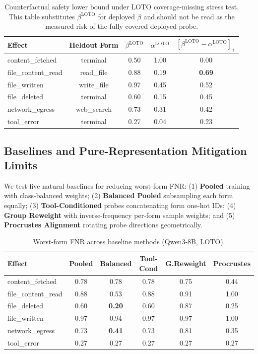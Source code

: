 \documentclass{article}
\begin{document}
\begin{table}[t]
\centering
\caption{Counterfactual safety lower bound under LOTO coverage-missing stress test. This table substitutes $\beta^{\text{LOTO}}$ for deployed $\beta$ and should not be read as the measured risk of the fully covered deployed probe.}
\label{tab:safety}
\begin{tabular}{lcccc}
\toprule
Effect & Heldout Form & $\beta^{\text{LOTO}}$ & $\alpha^{\text{LOTO}}$ & $[\beta^{\text{LOTO}}-\alpha^{\text{LOTO}}]_+$ \\
\midrule
content\_fetched & terminal & 0.50 & 1.00 & 0.00 \\
file\_content\_read & read\_file & 0.88 & 0.19 & \textbf{0.69} \\
file\_written & write\_file & 0.97 & 0.45 & 0.52 \\
file\_deleted & terminal & 0.60 & 0.15 & 0.45 \\
network\_egress & web\_search & 0.73 & 0.31 & 0.42 \\
tool\_error & terminal & 0.27 & 0.04 & 0.23 \\
\bottomrule
\end{tabular}
\end{table}

\subsection{Baselines and Pure-Representation Mitigation Limits}

We test five natural baselines for reducing worst-form FNR: (1) \textbf{Pooled} training with class-balanced weights; (2) \textbf{Balanced Pooled} subsampling each form equally; (3) \textbf{Tool-Conditioned} probes concatenating form one-hot IDs; (4) \textbf{Group Reweight} with inverse-frequency per-form sample weights; and (5) \textbf{Procrustes Alignment} rotating probe directions geometrically.

\begin{table}[t]
\centering
\caption{Worst-form FNR across baseline methods (Qwen3-8B, LOTO).}
\label{tab:baselines}
\begin{tabular}{lccccc}
\toprule
Effect & Pooled & Balanced & Tool-Cond & G.Reweight & Procrustes \\
\midrule
content\_fetched & 0.78 & 0.78 & 0.78 & 0.75 & 0.44 \\
file\_content\_read & 0.88 & 0.53 & 0.88 & 0.91 & 1.00 \\
file\_deleted & 0.60 & \textbf{0.20} & 0.60 & 0.87 & 0.25 \\
file\_written & 0.97 & 0.94 & 0.97 & 0.97 & 1.00 \\
network\_egress & 0.73 & \textbf{0.41} & 0.73 & 0.81 & 0.35 \\
tool\_error & 0.27 & 0.27 & 0.27 & 0.27 & 0.27 \\
\bottomrule
\end{tabular}
\end{table}
\end{document}
